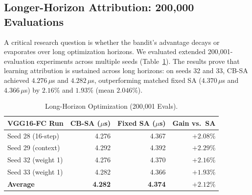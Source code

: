 \documentclass[10pt,conference]{IEEEtran}
\begin{document}
\subsection{Longer-Horizon Attribution: 200,000 Evaluations}
A critical research question is whether the bandit's advantage decays or evaporates over long optimization horizons. We evaluated extended 200,001-evaluation experiments across multiple seeds (Table~\ref{tab:200k-horizon}).
The results prove that learning attribution is sustained across long horizons: on seeds 32 and 33, CB-SA achieved $4.276\,\mu$s and $4.282\,\mu$s, outperforming matched fixed SA ($4.370\,\mu$s and $4.366\,\mu$s) by $\mathbf{2.16\%}$ and $\mathbf{1.93\%}$ (mean $\mathbf{2.046\%}$).

\begin{table}[t]
  \caption{Long-Horizon Optimization (200,001 Evals).}
  \label{tab:200k-horizon}
  \centering
  \footnotesize
  \setlength{\tabcolsep}{4pt}
  \begin{tabular}{lrrr}
    \toprule
    VGG16-FC Run & CB-SA ($\mu$s) & Fixed SA ($\mu$s) & Gain vs.\ SA \\
    \midrule
    Seed 28 (16-step) & 4.276 & 4.367 & $+2.08\%$ \\
    Seed 29 (context) & 4.292 & 4.392 & $+2.29\%$ \\
    Seed 32 (weight 1) & 4.276 & 4.370 & $+2.16\%$ \\
    Seed 33 (weight 1) & 4.282 & 4.366 & $+1.93\%$ \\
    \midrule
    \textbf{Average} & \textbf{4.282} & \textbf{4.374} & $\mathbf{+2.12\%}$ \\
    \bottomrule
  \end{tabular}
\end{table}
\end{document}
